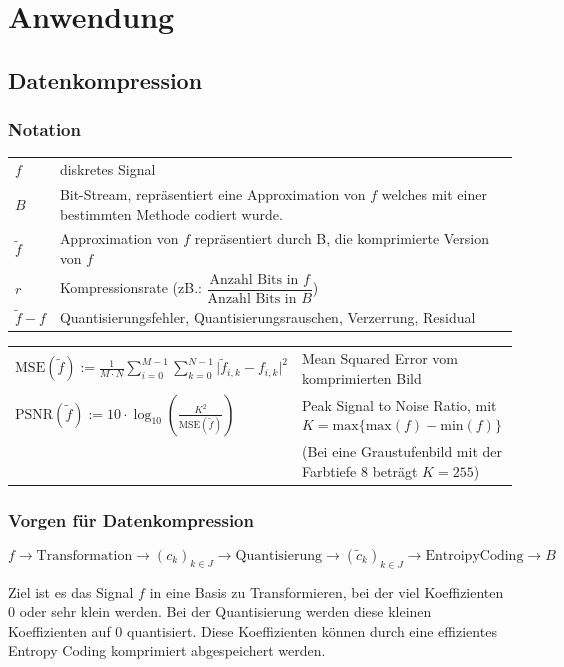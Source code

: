 \section{Anwendung}

\subsection{Datenkompression}

\subsubsection{Notation}
\begin{tabular}{ll}
$f$ & diskretes Signal\\
$B$ & Bit-Stream, repräsentiert eine Approximation von $f$ welches mit einer bestimmten Methode codiert wurde. \\
$\tilde{f}$ & Approximation von $f$ repräsentiert durch B, die komprimierte Version von $f$\\
$r$ & Kompressionsrate (zB.: $\dfrac{\text{Anzahl Bits in }f}{\text{Anzahl Bits in }B}$)\\
$\tilde{f}-f$ & Quantisierungsfehler, Quantisierungsrauschen, Verzerrung, Residual\\
\end{tabular}
\begin{tabular}{ll}
$\mathrm{MSE}(\tilde{f}) := \frac{1}{M \cdot N}\sum_{i=0}^{M-1}\sum_{k=0}^{N-1}\lvert \tilde{f}_{i,k}-f_{i,k} \rvert^2$ & Mean Squared Error vom komprimierten Bild\\
$\mathrm{PSNR}(\tilde{f}) := 10 \cdot \log_{10}(\frac{K^2}{\mathrm{MSE}(\tilde{f})})$ & Peak Signal to Noise Ratio, mit $K=\mathrm{max}\{\mathrm{max}(f)-\mathrm{min}(f)\}$ \\
 &  (Bei eine Graustufenbild mit der Farbtiefe 8 beträgt $K=255$)
\end{tabular}

\subsubsection{Vorgen für Datenkompression}
\[ 
	f \longrightarrow \boxed{\mathrm{Transformation}} \longrightarrow (c_k)_{k\in J} \longrightarrow \boxed{\mathrm{Quantisierung}} \longrightarrow (\tilde{c}_k)_{k \in J} \longrightarrow \boxed{\mathrm{Entroipy Coding}}\longrightarrow B 
\]

Ziel ist es das Signal $f$ in eine Basis zu Transformieren, bei der viel Koeffizienten 0 oder sehr klein werden. Bei der Quantisierung werden diese kleinen Koeffizienten auf 0 quantisiert. Diese Koeffizienten können durch eine effizientes Entropy Coding komprimiert abgespeichert werden.\\


